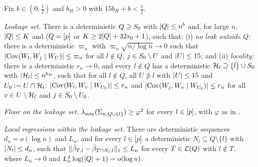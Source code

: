 Fix $b\in(0,\tfrac12)$ and $b_H>0$ with $15b_H+b<\tfrac12$.

\begin{localassumption}\label{asm:reported-random}
\begin{asmitems}
  \item\label{asm:rr-leak} \emph{Leakage set.} There is a deterministic $Q\supseteq S_0$ with $\lvert Q\rvert\le n^b$ and, for
    large $n$, $\lvert Q\rvert\le K$ and ($Q=[p]$ or $K\ge2\lvert Q\rvert+32s_0+1$), such that: (i) \emph{no leak outside $Q$:}
    there is a deterministic $\varpi_n$ with $\varpi_n\sqrt{n/\log n}\to0$ such that
    $\lvert \operatorname{Cov}(W_l,W_j\mid W_U)\rvert\le\varpi_n$ for all $l\notin Q$, $j\in S_0\setminus U$ and $\lvert U\rvert\le15$; and (ii)
    \emph{locality:} there is a deterministic $r_n\to0$, and every $l\notin Q$ has a deterministic
    $\mathcal H_l\supseteq\{l\}\cup S_0$ with $\lvert \mathcal H_l\rvert\le n^{b_H}$, such that for all $l\notin Q$, all $U\not\ni l$ with
    $\lvert U\rvert\le15$ and $U_0:=U\cap\mathcal H_l$: $\lvert \operatorname{Cov}(W_l,W_v\mid W_{U_0})\rvert\le r_n$ and
    $\lvert \operatorname{Cov}(W_j,W_v\mid W_{U_0})\rvert\le r_n$ for all $v\in U\setminus\mathcal H_l$ and $j\in S_0\setminus U_0$.
  \item\label{asm:rr-floor} \emph{Floor on the leakage set.} $\lambda_{\min}(\Sigma_{n,Q\cup\{l\}})\ge\varphi^2$ for every
    $l\in[p]$, with $\varphi$ as in .
  \item\label{asm:rr-local} \emph{Local regressions within the leakage set.} There are deterministic sequences
    $d_n=o(\log n)$ and $L_n$, and for every $l\in[p]$ a deterministic $N_l\subseteq Q\setminus\{l\}$ with
    $\lvert N_l\rvert\le d_n$, such that $\lVert \bar\beta_{T,l}-\bar\beta_{T\cap N_l,l}\rVert_1\le L_n$ for every $T\in\mathcal L(Q)$ with
    $l\notin T$, where $L_n\to0$ and $L_n^2\log(\lvert Q\rvert+1)=o(\log n)$.
\end{asmitems}
\end{localassumption}

